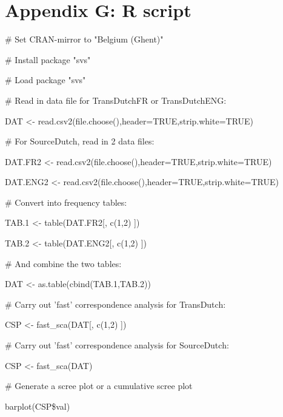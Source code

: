 \section{Appendix G: R script}

\# Set CRAN-mirror to "Belgium (Ghent)"



\# Install package "svs"



\# Load package "svs"



\# Read in data file for TransDutchFR or TransDutchENG:



DAT <- read.csv2(file.choose(),header=TRUE,strip.white=TRUE)



\# For SourceDutch, read in 2 data files:



DAT.FR2 <- read.csv2(file.choose(),header=TRUE,strip.white=TRUE)



DAT.ENG2 <- read.csv2(file.choose(),header=TRUE,strip.white=TRUE)



\# Convert into frequency tables:



TAB.1 <- table(DAT.FR2[, c(1,2) ])



TAB.2 <- table(DAT.ENG2[, c(1,2) ])



\# And combine the two tables:



DAT <- as.table(cbind(TAB.1,TAB.2))



\# Carry out 'fast' correspondence analysis for TransDutch:



CSP <- fast\_sca(DAT[, c(1,2) ])



\# Carry out 'fast' correspondence analysis for SourceDutch:



CSP <- fast\_sca(DAT)



\# Generate a scree plot or a cumulative scree plot



barplot(CSP\$val)



